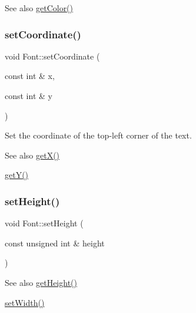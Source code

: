 \begin{DoxySeeAlso}{See also}
\mbox{\hyperlink{class_font_a1a8880f99db17a98294d9bfb8d5b6a25}{get\+Color()}} 
\end{DoxySeeAlso}
\mbox{\label{class_font_a1c07aeed965112704d0872e9093c38a3}} 
\subsubsection{\texorpdfstring{set\+Coordinate()}{setCoordinate()}}
{\footnotesize\ttfamily void Font\+::set\+Coordinate (\begin{DoxyParamCaption}\item[{const int \&}]{x,  }\item[{const int \&}]{y }\end{DoxyParamCaption})}



Set the coordinate of the top-\/left corner of the text. 

\begin{DoxySeeAlso}{See also}
\mbox{\hyperlink{class_font_a88e52dca0997ab9c21ac656d67259961}{get\+X()}} 

\mbox{\hyperlink{class_font_a8701db15b5977fd99f8622505194a27d}{get\+Y()}} 
\end{DoxySeeAlso}
\mbox{\label{class_font_adc672745b542873f41cd3e13c3b05da3}} 
\subsubsection{\texorpdfstring{set\+Height()}{setHeight()}}
{\footnotesize\ttfamily void Font\+::set\+Height (\begin{DoxyParamCaption}\item[{const unsigned int \&}]{height }\end{DoxyParamCaption})}

\begin{DoxySeeAlso}{See also}
\mbox{\hyperlink{class_font_a2a6d1fe37cc96a265144c958f5492676}{get\+Height()}} 

\mbox{\hyperlink{class_font_a97115438619656cb75d5b87636cec75e}{set\+Width()}} 
\end{DoxySeeAlso}
\mbox{\label{class_font_a97115438619656cb75d5b87636cec75e}} 
